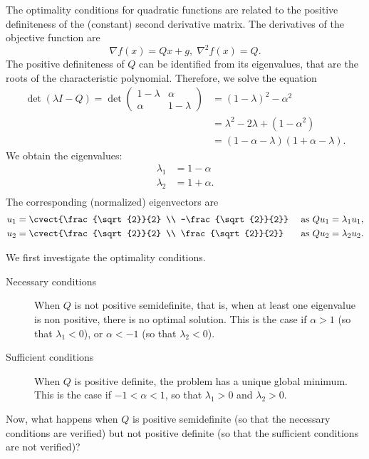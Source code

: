 
The optimality conditions for quadratic functions are related to the
positive definiteness of the (constant) second derivative matrix.
The derivatives of the objective function are
\[
\nabla f(x) = {Qx + g}, \; \nabla^2 f(x) = Q.
\]
The positive definiteness of $Q$ can be identified from its
eigenvalues, that are the roots of the characteristic
polynomial. Therefore, we solve the equation
\begin{align*}
\det(\lambda I - Q) = \det \begin{pmatrix}
1- \lambda & \alpha\\ \alpha & 1-\lambda
\end{pmatrix} & = (1-\lambda)^2 - \alpha^2\\
& = \lambda^2 - 2\lambda + (1-\alpha^2)\\
& = (1-\alpha - \lambda)(1+\alpha - \lambda).
\end{align*}
We obtain the eigenvalues:
\begin{align*}
\lambda_1 & = 1-\alpha\\
\lambda_2 & = 1+\alpha.\\
\end{align*}
The corresponding (normalized) eigenvectors are
\begin{align*}
u_1 &= \cvect{\frac{\sqrt{2}}{2} \\ -\frac{\sqrt{2}}{2}} & \text{ as } Qu_1 = \lambda_1 u_1,\\
u_2 &= \cvect{\frac{\sqrt{2}}{2} \\ \frac{\sqrt{2}}{2}} & \text{ as } Qu_2 = \lambda_2 u_2.
\end{align*}

We first investigate the optimality conditions.
\begin{description}
\item[Necessary conditions]  When $Q$ is not positive
  semidefinite, that is, when at least one eigenvalue is non
  positive, there is no optimal solution. This is the case if $\alpha > 1$ (so that $\lambda_1 <
  0$), or $\alpha  < -1$ (so that $\lambda_2 < 0$).
\item[Sufficient conditions] When $Q$ is positive definite, the
  problem has a unique global minimum. This is the case if $-1 <
  \alpha < 1$, so that $\lambda_1 > 0$ and $\lambda_2 > 0$.
\end{description}
Now, what happens when $Q$ is positive  semidefinite (so that the
necessary conditions are verified) but not positive definite (so that
the sufficient conditions are not verified)?

